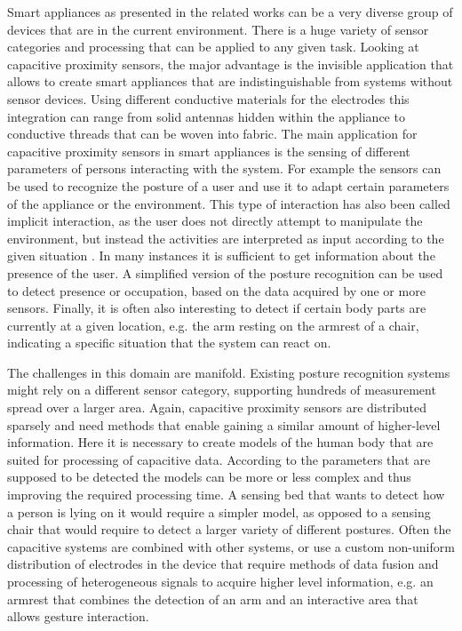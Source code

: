 Smart appliances as presented in the related works can be a very diverse group of devices that are in the current environment. There is a huge variety of sensor categories and processing that can be applied to any given task. Looking at capacitive proximity sensors, the major advantage is the invisible application that allows to create smart appliances that are indistinguishable from systems without sensor devices. Using different conductive materials for the electrodes this integration can range from solid antennas hidden within the appliance to conductive threads that can be woven into fabric. The main application for capacitive proximity sensors in smart appliances is the sensing of different parameters of persons interacting with the system. For example the sensors can be used to recognize the posture of a user and use it to adapt certain parameters of the appliance or the environment. This type of interaction has also been called implicit interaction, as the user does not directly attempt to manipulate the environment, but instead the activities are interpreted as input according to the given situation \cite{schmidt2001build}. In many instances it is sufficient to get information about the presence of the user. A simplified version of the posture recognition can be used to detect presence or occupation, based on the data acquired by one or more sensors. Finally, it is often also interesting to detect if certain body parts are currently at a given location, e.g. the arm resting on the armrest of a chair, indicating a specific situation that the system can react on.

The challenges in this domain are manifold. Existing posture recognition systems might rely on a different sensor category, supporting hundreds of measurement spread over a larger area. Again, capacitive proximity sensors are distributed sparsely and need methods that enable gaining a similar amount of higher-level information. Here it is necessary to create models of the human body that are suited for processing of capacitive data. According to the parameters that are supposed to be detected the models can be more or less complex and thus improving the required processing time. A sensing bed that wants to detect how a person is lying on it would require a simpler model, as opposed to a sensing chair that would require to detect a larger variety of different postures. Often the capacitive systems are combined with other systems, or use a custom non-uniform distribution of electrodes in the device that require methods of data fusion and processing of heterogeneous signals to acquire higher level information, e.g. an armrest that combines the detection of an arm and an interactive area that allows gesture interaction.

